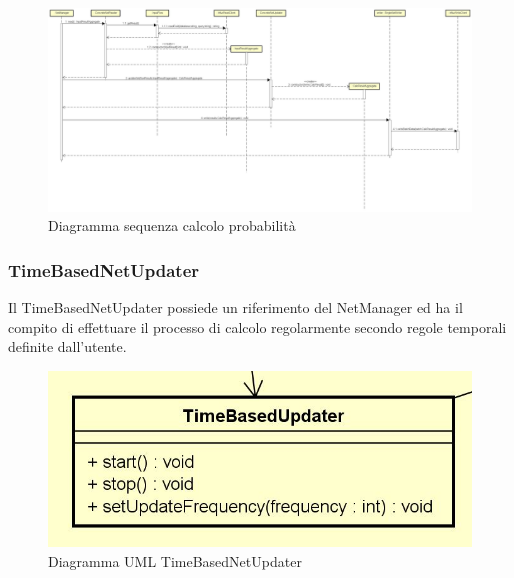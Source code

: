 \begin{figure} [H]
	\centering
			\includegraphics[scale=0.17]{Img/ProcessoRicalcolo}
	\caption{Diagramma sequenza calcolo probabilità}\label{}
\end{figure}
\subsubsection{TimeBasedNetUpdater}
Il TimeBasedNetUpdater possiede un riferimento del NetManager ed ha il compito di effettuare il processo di calcolo regolarmente secondo regole temporali definite dall'utente.
\begin{figure} [H]
	\centering
		\includegraphics[scale=0.8]{Img/TimeBasedUpdater}
	\caption{Diagramma UML TimeBasedNetUpdater}\label{}
\end{figure}

